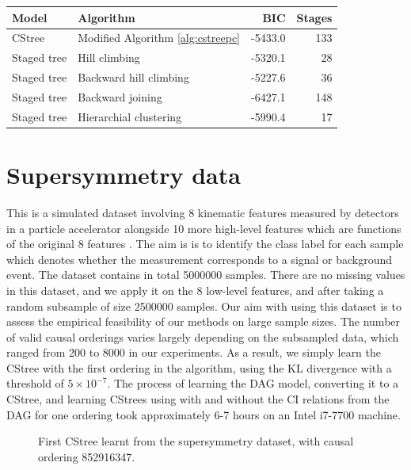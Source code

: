 \documentclass{tufte-book}
\begin{document}
\begin{Definition}
\begin{center}
\begin{tabular}{l|l|r|r}
\hline
Model & Algorithm & BIC & Stages\\
\hline
CStree & Modified Algorithm \ref{alg:cstreepc} & -5433.0 & 133\\
Staged tree & Hill climbing & -5320.1 & 28\\
Staged tree & Backward hill climbing & -5227.6 & 36\\
Staged tree & Backward joining & -6427.1 & 148\\
Staged tree & Hierarchial clustering & -5990.4 & 17\\
\end{tabular}
\end{center}

 \newpage 


\section{Supersymmetry data}
\label{sec:orgbad60f1}

This is a simulated dataset involving 8 kinematic features measured by detectors in a particle accelerator alongside 10 more high-level features which are functions of the original 8 features \cite{baldi-2014-searc-exotic}. The aim is is to identify the class label for each sample which denotes whether the measurement corresponds to a signal or background event. The dataset contains in total 5000000 samples. There are no missing values in this dataset, and we apply it on the 8 low-level features, and after taking a random subsample of size 2500000 samples. Our aim with using this dataset is to assess the empirical feasibility of our methods on large sample sizes. The number of valid causal orderings varies largely depending on the subsampled data, which ranged from 200 to 8000 in our experiments. As a result, we simply learn the CStree with the first ordering in the algorithm,  using the KL divergence with a threshold of \(5\times 10^{-7}\). The process of learning the DAG model, converting it to a CStree, and learning CStrees using with and without the CI relations from the DAG for one ordering took approximately 6-7 hours on an Intel i7-7700 machine. 

\begin{figure}[!h]\label{fig:susy1}
   \begin{floatrow}
%
\caption{First CStree learnt from the supersymmetry dataset, with causal ordering 852916347.}
        

\end{floatrow}
\end{figure}
\end{Definition}
\end{document}

